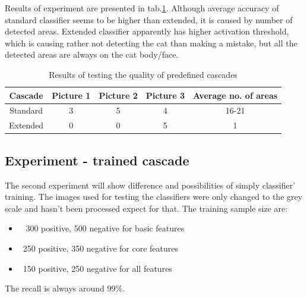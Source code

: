 \documentclass[hyperref]{acmtrans2e}
\begin{document}
Results of experiment are presented in tab.\ref{tab:pre}. Although average accuracy of standard classifier seems to be higher than extended, it is caused by number of detected areas. Extended classifier apparently has higher activation threshold, which is causing rather not detecting the cat than making a mistake, but all the detected areas are always on the cat body/face. 
\begin{table}

\centering
\begin{tabular}{| c | c | c | c | c |}
   \hline
   Cascade & Picture 1 & Picture 2 & Picture 3 & Average no. of areas  \\ \hline
   Standard & 3 & 5 & 4& 16-21 \\ \hline
   Extended & 0 & 0 & 5 & 1 \\  \hline
\end{tabular}
\caption{Results of testing the quality of predefined cascades}
\label{tab:pre}
\end{table}

\subsection{Experiment - trained cascade}
The second experiment will show difference and possibilities of simply classifier' training. The images used for testing the classifiers were only changed to the grey scale and hasn't been processed expect for that. The training sample size are:
\begin{itemize}
\item~ 300 positive, 500 negative for basic features
\item ~250 positive, 350 negative for core features
\item ~150 positive, 250 negative for all features
\end{itemize}
The recall is always around 99\%.
\end{document}

